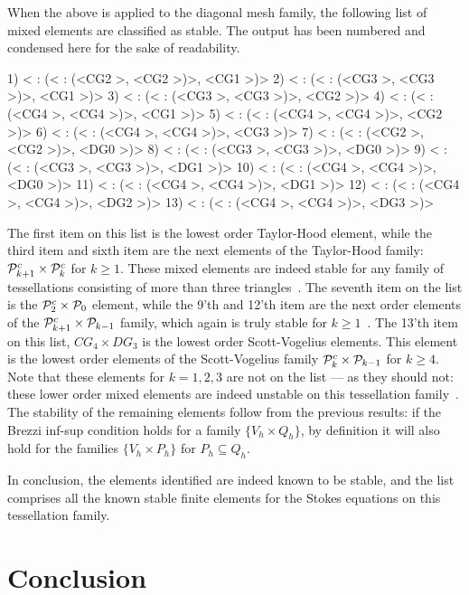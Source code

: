 When the above is applied to the diagonal mesh family, the following
list of mixed elements are classified as stable. The output has been
numbered and condensed here for the sake of readability.
\begin{python}
1)  < : (< : (<CG2   >, <CG2   >)>, <CG1   >)>
2)  < : (< : (<CG3   >, <CG3   >)>, <CG1   >)>
3)  < : (< : (<CG3   >, <CG3   >)>, <CG2   >)>
4)  < : (< : (<CG4   >, <CG4   >)>, <CG1   >)>
5)  < : (< : (<CG4   >, <CG4   >)>, <CG2   >)>
6)  < : (< : (<CG4   >, <CG4   >)>, <CG3   >)>
7)  < : (< : (<CG2   >, <CG2   >)>, <DG0   >)>
8)  < : (< : (<CG3   >, <CG3   >)>, <DG0   >)>
9)  < : (< : (<CG3   >, <CG3   >)>, <DG1   >)>
10) < : (< : (<CG4   >, <CG4   >)>, <DG0   >)>
11) < : (< : (<CG4   >, <CG4   >)>, <DG1   >)>
12) < : (< : (<CG4   >, <CG4   >)>, <DG2   >)>
13) < : (< : (<CG4   >, <CG4   >)>, <DG3   >)>
\end{python}
The first item on this list is the lowest order Taylor-Hood element,
while the third item and sixth item are the next elements of the
Taylor-Hood family: $\mathcal{P}^c_{k+1} \times \mathcal{P}^c_{k}$ for $k \geq 1$. These
mixed elements are indeed stable for any family of tessellations
consisting of more than three triangles~\cite{TaylorHood1973,
  BrezziFalk1991}. The seventh item on the list is the $\mathcal{P}^c_2 \times
\mathcal{P}_0$ element, while the 9'th and 12'th item are the next order
elements of the $\mathcal{P}^c_{k+1} \times \mathcal{P}_{k-1}$ family, which again is
truly stable for $k \geq 1$~\cite{P2xP0guys}. The 13'th item on this
list, $CG_4 \times DG_3$ is the lowest order Scott-Vogelius
elements. This element is the lowest order elements of the
Scott-Vogelius family $\mathcal{P}^c_{k} \times \mathcal{P}_{k-1}$ for $k \geq 4$. Note
that these elements for $k = 1, 2, 3$ are not on the list --- as they
should not: these lower order mixed elements are indeed unstable on
this tessellation family~\cite{Qin1994}. The stability of the
remaining elements follow from the previous results: if the Brezzi
inf-sup condition holds for a family $\{V_h \times Q_h\}$, by
definition it will also hold for the families $\{V_h \times P_h\}$ for
$P_h \subseteq Q_h$.

In conclusion, the elements identified are indeed known to be stable,
and the list comprises all the known stable finite elements for the
Stokes equations on this tessellation family.


\section{Conclusion}
\label{rognes:sec:conclusion}


